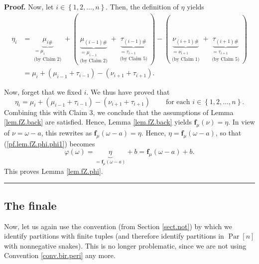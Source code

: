 \documentclass[numbers=enddot,12pt,final,onecolumn,notitlepage]{scrartcl}%
\theoremstyle{definition}
\newenvironment{proof}[1][Proof]{\noindent\textbf{#1.} }{\ \rule{0.5em}{0.5em}}
\begin{document}
\begin{proof}
Now, let $i\in\left\{  1,2,\ldots,n\right\}  $. Then, the definition of $\eta$
yields%
\begin{align*}
\eta_{i}  &  =\underbrace{\mu_{i\#}}_{\substack{=\mu_{i}\\\text{(by Claim 2)}%
}}+\left(  \underbrace{\mu_{\left(  i-1\right)  \#}}_{\substack{=\mu
_{i-1}\\\text{(by Claim 2)}}}+\underbrace{\tau_{\left(  i-1\right)  \#}%
}_{\substack{=\tau_{i-1}\\\text{(by Claim 5)}}}\right)  -\left(
\underbrace{\nu_{\left(  i+1\right)  \#}}_{\substack{=\nu_{i+1}\\\text{(by
Claim 1)}}}+\underbrace{\tau_{\left(  i+1\right)  \#}}_{\substack{=\tau
_{i+1}\\\text{(by Claim 5)}}}\right) \\
&  =\mu_{i}+\left(  \mu_{i-1}+\tau_{i-1}\right)  -\left(  \nu_{i+1}+\tau
_{i+1}\right)  .
\end{align*}


Now, forget that we fixed $i$. We thus have proved that
\[
\eta_{i}=\mu_{i}+\left(  \mu_{i-1}+\tau_{i-1}\right)  -\left(  \nu_{i+1}%
+\tau_{i+1}\right)  \ \ \ \ \ \ \ \ \ \ \text{for each }i\in\left\{
1,2,\ldots,n\right\}  .
\]
Combining this with Claim 3, we conclude that the assumptions of Lemma
\ref{lem.fZ.back} are satisfied. Hence, Lemma \ref{lem.fZ.back} yields
$\mathbf{f}_{\mu}\left(  \nu\right)  =\eta$. In view of $\nu=\omega-a$, this
rewrites as $\mathbf{f}_{\mu}\left(  \omega-a\right)  =\eta$. Hence,
$\eta=\mathbf{f}_{\mu}\left(  \omega-a\right)  $, so that
(\ref{pf.lem.fZ.phi.phi1}) becomes%
\[
\varphi\left(  \omega\right)  =\underbrace{\eta}_{=\mathbf{f}_{\mu}\left(
\omega-a\right)  }+b=\mathbf{f}_{\mu}\left(  \omega-a\right)  +b.
\]
This proves Lemma \ref{lem.fZ.phi}.
\end{proof}

\subsection{The finale}

Now, let us again use the convention (from Section \ref{sect.not}) by which we
identify partitions with finite tuples (and therefore identify partitions in
$\operatorname*{Par}\left[  n\right]  $ with nonnegative snakes). This is no
longer problematic, since we are not using Convention \ref{conv.bir.peri} any more.
\end{document}
